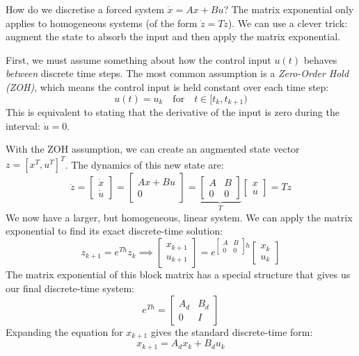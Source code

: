 How do we discretise a forced system $\dot{{x}} = {A}{x} + {B}{u}$? The matrix exponential only applies to homogeneous systems (of the form $\dot{{z}} = {T}{z}$). We can use a clever trick: augment the state to absorb the input and then apply the matrix exponential.

First, we must assume something about how the control input ${u}(t)$ behaves \textit{between} discrete time steps. The most common assumption is a \emph{Zero-Order Hold (ZOH)}, which means the control input is held constant over each time step:
\[
{u}(t) = {u}_k \quad \text{for} \quad t \in [t_k, t_{k+1})
\]
This is equivalent to stating that the derivative of the input is zero during the interval: $\dot{{u}} = {0}$.

With the ZOH assumption, we can create an augmented state vector ${z} = [{x}^T, {u}^T]^T$. The dynamics of this new state are:
\[
\dot{{z}} = \begin{bmatrix} \dot{{x}} \\ \dot{{u}} \end{bmatrix} = \begin{bmatrix} {A}{x} + {B}{u} \\ {0} \end{bmatrix} = \underbrace{\begin{bmatrix} {A} & {B} \\ {0} & {0} \end{bmatrix}}_{{T}} \begin{bmatrix} {x} \\ {u} \end{bmatrix} = {T}{z}
\]
We now have a larger, but homogeneous, linear system. We can apply the matrix exponential to find its exact discrete-time solution:
\[
{z}_{k+1} = e^{{T}h} {z}_k \implies \begin{bmatrix} {x}_{k+1} \\ {u}_{k+1} \end{bmatrix} = e^{\begin{bmatrix} {A} & {B} \\ {0} & {0} \end{bmatrix}h} \begin{bmatrix} {x}_k \\ {u}_k \end{bmatrix}
\]
The matrix exponential of this block matrix has a special structure that gives us our final discrete-time system:
\[
e^{{T}h} = \begin{bmatrix} {A}_d & {B}_d \\ {0} & {I} \end{bmatrix}
\]
Expanding the equation for ${x}_{k+1}$ gives the standard discrete-time form:
\begin{equation}\label{eqn:stateEquation}
	{x}_{k+1} = {A}_d {x}_k + {B}_d {u}_k
\end{equation}


